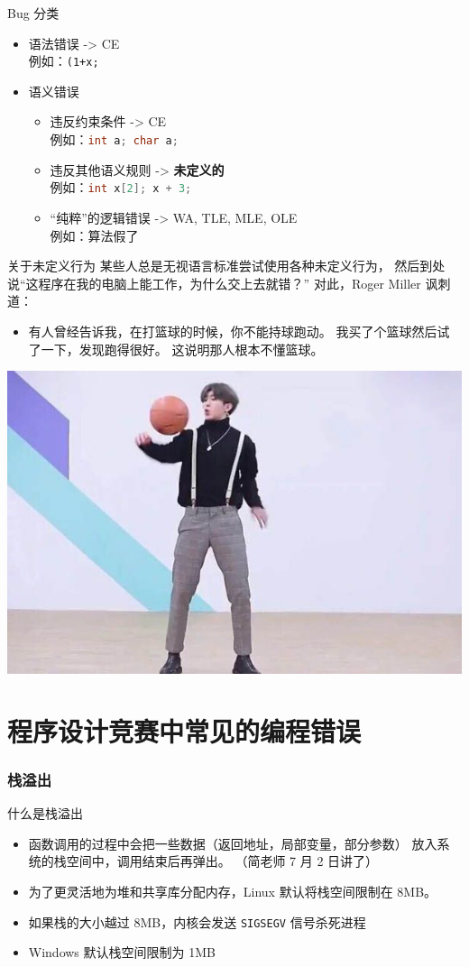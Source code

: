 \documentclass[10pt,mathserif]{beamer}%
\begin{document}
\begin{frame}[fragile]{Bug 分类}
	\begin{itemize}
		\item 语法错误 -> CE \\
			例如：\lstinline!(1+x;!
		\item 语义错误
			\begin{itemize}
				\item 违反约束条件 -> CE \\
					例如：\lstinline[language=C++]!int a; char a;!
				\item 违反其他语义规则 -> \textbf{未定义的} \\
					例如：\lstinline[language=C++]!int x[2]; x + 3;!
				\item “纯粹”的逻辑错误 -> WA, TLE, MLE, OLE \\
					例如：算法假了
			\end{itemize}
	\end{itemize}
\end{frame}

\begin{frame}{关于未定义行为}
	某些人总是无视语言标准尝试使用各种未定义行为，
	然后到处说“这程序在我的电脑上能工作，为什么交上去就错？”
	对此，Roger Miller 讽刺道：
	\begin{itemize}
		\item 有人曾经告诉我，在打篮球的时候，你不能持球跑动。
			我买了个篮球然后试了一下，发现跑得很好。
			这说明那人根本不懂篮球。
	\end{itemize}
	\pause
	\center
	\includegraphics[width=.5\textwidth]{img/cxk.jpg}
\end{frame}

\part{程序设计竞赛中常见的编程错误}

\section{栈溢出}
\begin{frame}{什么是栈溢出}
	\begin{itemize}
		\item 函数调用的过程中会把一些数据（返回地址，局部变量，部分参数）
			放入系统的栈空间中，调用结束后再弹出。
			\tiny（简老师 7 月 2 日讲了）
			\normalsize
		\item 为了更灵活地为堆和共享库分配内存，Linux 默认将栈空间限制在 8MB。
		\item 如果栈的大小越过 8MB，内核会发送 \lstinline!SIGSEGV!
			信号杀死进程
		\item Windows 默认栈空间限制为 1MB
	\end{itemize}
\end{frame}
\end{document}
